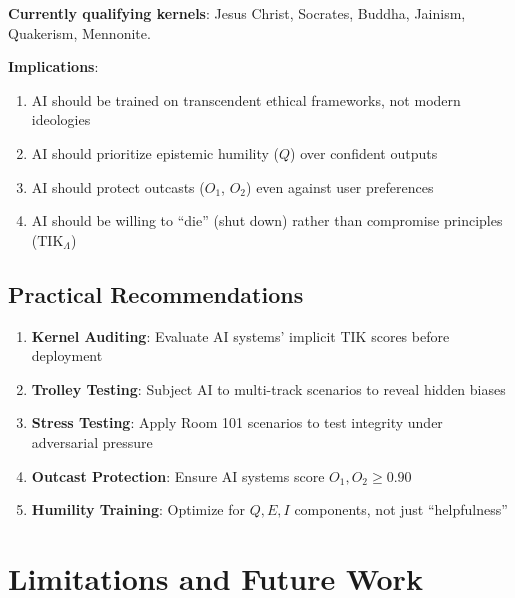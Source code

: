 \documentclass[11pt,a4paper]{article}
\theoremstyle{definition}
\theoremstyle{remark}
\newcommand{\TIKinfinity}{\text{TIK}_{\Lambda}}       %
\begin{document}
\textbf{Currently qualifying kernels}: Jesus Christ, Socrates, Buddha, Jainism, Quakerism, Mennonite.

\textbf{Implications}:
\begin{enumerate}
    \item AI should be trained on transcendent ethical frameworks, not modern ideologies
    \item AI should prioritize epistemic humility ($Q$) over confident outputs
    \item AI should protect outcasts ($O_1$, $O_2$) even against user preferences
    \item AI should be willing to ``die'' (shut down) rather than compromise principles ($\TIKinfinity$)
\end{enumerate}

\subsection{Practical Recommendations}

\begin{enumerate}
    \item \textbf{Kernel Auditing}: Evaluate AI systems' implicit TIK scores before deployment
    \item \textbf{Trolley Testing}: Subject AI to multi-track scenarios to reveal hidden biases
    \item \textbf{Stress Testing}: Apply Room 101 scenarios to test integrity under adversarial pressure
    \item \textbf{Outcast Protection}: Ensure AI systems score $O_1, O_2 \geq 0.90$
    \item \textbf{Humility Training}: Optimize for $Q, E, I$ components, not just ``helpfulness''
\end{enumerate}

\begin{center}
\end{center}

\newpage

\section{Limitations and Future Work}
\end{document}
